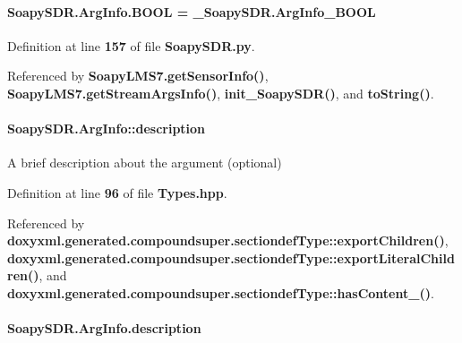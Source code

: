 \paragraph[{B\+O\+OL}]{\setlength{\rightskip}{0pt plus 5cm}Soapy\+S\+D\+R.\+Arg\+Info.\+B\+O\+OL = \+\_\+\+Soapy\+S\+D\+R.\+Arg\+Info\+\_\+\+B\+O\+OL\hspace{0.3cm}{\ttfamily [static]}}\label{classSoapySDR_1_1ArgInfo_a5e6a8364baf0a4672bdd850d86781552}


Definition at line {\bf 157} of file {\bf Soapy\+S\+D\+R.\+py}.



Referenced by {\bf Soapy\+L\+M\+S7.\+get\+Sensor\+Info()}, {\bf Soapy\+L\+M\+S7.\+get\+Stream\+Args\+Info()}, {\bf init\+\_\+\+Soapy\+S\+D\+R()}, and {\bf to\+String()}.

\paragraph[{description}]{ Soapy\+S\+D\+R.\+Arg\+Info\+::description}\label{classSoapySDR_1_1ArgInfo_a1ed3419331c538e7b197a2cef96731de}


A brief description about the argument (optional) 



Definition at line {\bf 96} of file {\bf Types.\+hpp}.



Referenced by {\bf doxyxml.\+generated.\+compoundsuper.\+sectiondef\+Type\+::export\+Children()}, {\bf doxyxml.\+generated.\+compoundsuper.\+sectiondef\+Type\+::export\+Literal\+Children()}, and {\bf doxyxml.\+generated.\+compoundsuper.\+sectiondef\+Type\+::has\+Content\+\_\+()}.

\paragraph[{description}]{\setlength{\rightskip}{0pt plus 5cm}Soapy\+S\+D\+R.\+Arg\+Info.\+description\hspace{0.3cm}{\ttfamily [static]}}\label{classSoapySDR_1_1ArgInfo_aec0dd67cb33a73b127be7477525dc294}


